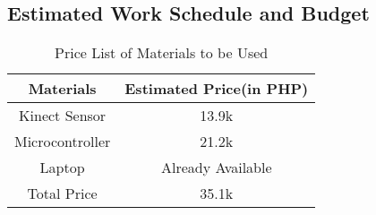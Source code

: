 \subsection{Estimated Work Schedule and Budget}
\begin{table}[!htb]
	\caption{Price List of Materials to be Used}
	\centering
	\begin{tabular}{|c|c|}
		\hline
		Materials & Estimated Price(in PHP) \\
		\hline
		Kinect Sensor & 13.9k \\
		\hline
		Microcontroller & 21.2k \\
		\hline
		Laptop & Already Available \\
		\hline
		Total Price & 35.1k \\
		\hline
	\end{tabular}
\end{table}